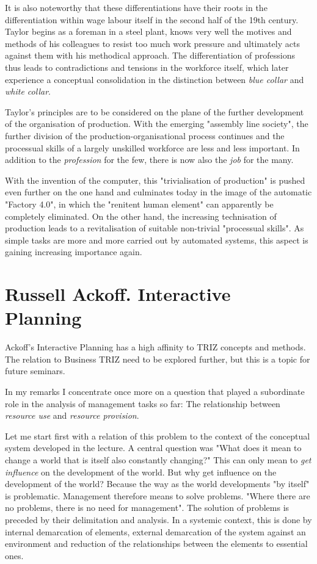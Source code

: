 \documentclass[11pt,a4paper]{article}
\begin{document}
It is also noteworthy that these differentiations have their roots in the
differentiation within wage labour itself in the second half of the 19th
century. Taylor begins as a foreman in a steel plant, knows very well the
motives and methods of his colleagues to resist too much work pressure and
ultimately acts against them with his methodical approach. The differentiation
of professions thus leads to contradictions and tensions in the workforce
itself, which later experience a conceptual consolidation in the distinction
between \emph{blue collar} and \emph{white collar}.

Taylor's principles are to be considered on the plane of the further
development of the organisation of production. With the emerging "assembly
line society", the further division of the production-organisational process
continues and the processual skills of a largely unskilled workforce are less
and less important. In addition to the \emph{profession} for the few, there is
now also the \emph{job} for the many.

With the invention of the computer, this "trivialisation of production" is
pushed even further on the one hand and culminates today in the image of the
automatic "Factory 4.0", in which the "renitent human element" can apparently
be completely eliminated. On the other hand, the increasing technisation of
production leads to a revitalisation of suitable non-trivial "processual
skills". As simple tasks are more and more carried out by automated systems,
this aspect is gaining increasing importance again.

\section{Russell Ackoff. Interactive Planning}

Ackoff's Interactive Planning has a high affinity to TRIZ concepts and
methods.  The relation to Business TRIZ need to be explored further, but this
is a topic for future seminars.

In my remarks I concentrate once more on a question that played a subordinate
role in the analysis of management tasks so far: The relationship between
\emph{resource use} and \emph{resource provision}.

Let me start first with a relation of this problem to the context of the
conceptual system developed in the lecture. A central question was "What does
it mean to change a world that is itself also constantly changing?" This can
only mean to \emph{get influence} on the development of the world. But why get
influence on the development of the world? Because the way as the world
developments "by itself" is problematic. Management therefore means to solve
problems. "Where there are no problems, there is no need for management". The
solution of problems is preceded by their delimitation and analysis. In a
systemic context, this is done by internal demarcation of elements, external
demarcation of the system against an environment and reduction of the
relationships between the elements to essential ones.
\end{document}
